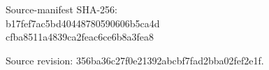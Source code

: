 \par\smallskip\noindent\begin{minipage}{\linewidth}
\noindent Source-manifest SHA-256:\\
{\small\ttfamily b17fef7ac5bd40448780590606b5ca4d\\
cfba8511a4839ca2feac6ce6b8a3fea8}\par
\noindent Source revision: {\small\ttfamily 356ba36c27f0e21392abcbf7fad2bba02fef2e1f}.\par
\end{minipage}\par
